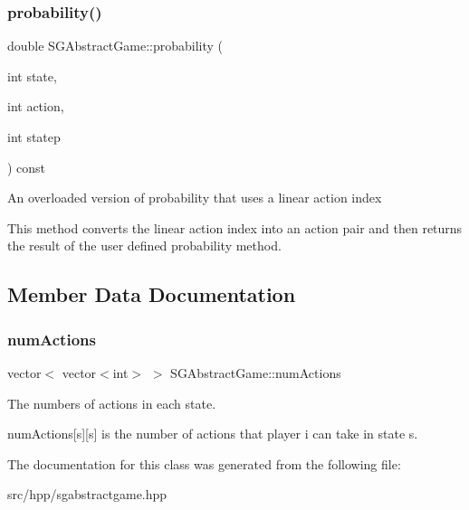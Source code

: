 \subsubsection{\texorpdfstring{probability()}{probability()}\hspace{0.1cm}{\footnotesize\ttfamily [2/2]}}
{\footnotesize\ttfamily double S\+G\+Abstract\+Game\+::probability (\begin{DoxyParamCaption}\item[{int}]{state,  }\item[{int}]{action,  }\item[{int}]{statep }\end{DoxyParamCaption}) const\hspace{0.3cm}{\ttfamily [inline]}}

An overloaded version of probability that uses a linear action index

This method converts the linear action index into an action pair and then returns the result of the user defined probability method. 

\subsection{Member Data Documentation}
\mbox{\label{classSGAbstractGame_a907a945ec0afb42dfeb164b4520879c5}} 
\subsubsection{\texorpdfstring{num\+Actions}{numActions}}
{\footnotesize\ttfamily vector$<$ vector$<$int$>$ $>$ S\+G\+Abstract\+Game\+::num\+Actions\hspace{0.3cm}{\ttfamily [protected]}}



The numbers of actions in each state. 

num\+Actions\mbox{[}s\mbox{]}\mbox{[}s\mbox{]} is the number of actions that player i can take in state s. 

The documentation for this class was generated from the following file\+:\begin{DoxyCompactItemize}
\item 
src/hpp/sgabstractgame.\+hpp\end{DoxyCompactItemize}
